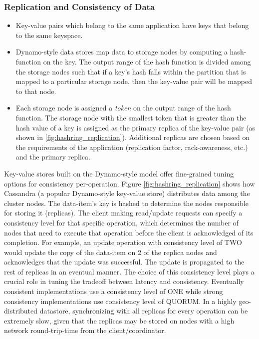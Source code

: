 \subsubsection{Replication and Consistency of Data}
\label{sec:replication}
\begin{itemize}
\item Key-value pairs which belong to the same application have keys that belong to the same keyspace. 
\item Dynamo-style data stores map data to storage nodes by computing a hash-function on the key. The output range of the hash function is divided among the storage nodes such that if a key's hash falls within the partition that is mapped to a particular storage node, then the key-value pair will be mapped to that node. 
\item Each storage node is assigned a \textit{token} on the output range of the hash function. The storage node with the smallest token that is greater than the hash value of a key is assigned as the primary replica of the key-value pair (as shown in \cref{fig:hashring_replication}). Additional replicas are chosen based on the requirements of the application (replication factor, rack-awareness, etc.) and the primary replica.
\end{itemize}

Key-value stores built on the Dynamo-style model offer fine-grained tuning options for consistency per-operation. Figure \cref{fig:hashring_replication} shows how Cassandra (a popular Dynamo-style key-value store) distributes data among the cluster nodes. The data-item’s key is hashed to determine the nodes responsible for storing it (replicas). The client making read/update requests can specify a consistency level for that specific operation, which determines the number of nodes that need to execute that operation before the client is acknowledged of its completion. For example, an update operation with consistency level of TWO would update the copy of the data-item on 2 of the replica nodes and acknowledges that the update was successful. The update is propagated to the rest of replicas in an eventual manner. The choice of this consistency level plays a crucial role in tuning the tradeoff between latency and consistency. Eventually consistent implementations use a consistency level of ONE while strong consistency implementations use consistency level of QUORUM. In a highly geo-distributed datastore, synchronizing with all replicas for every operation can be extremely slow, given that the replicas may be stored on nodes with a high network round-trip-time from the client/coordinator.

